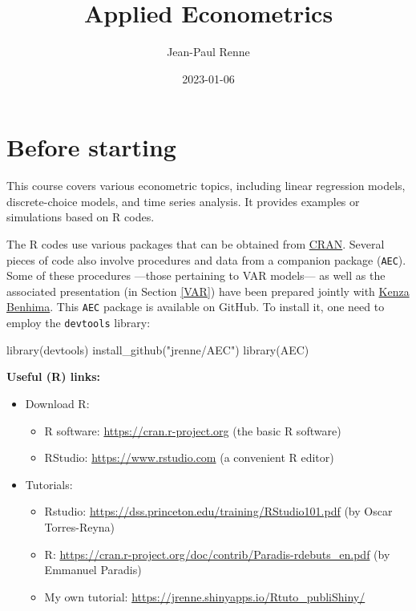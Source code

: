 \documentclass[
  12pt,
]{book}
\title{Applied Econometrics}
\author{Jean-Paul Renne}
\date{2023-01-06}
\newenvironment{Shaded}{\begin{snugshade}}{\end{snugshade}}
\newcommand{\FunctionTok}[1]{\textcolor[rgb]{0.00,0.00,0.00}{#1}}
\newcommand{\NormalTok}[1]{#1}
\newcommand{\StringTok}[1]{\textcolor[rgb]{0.31,0.60,0.02}{#1}}
\providecommand{\tightlist}{%
  \setlength{\itemsep}{0pt}\setlength{\parskip}{0pt}}
\theoremstyle{definition}
\theoremstyle{definition}
\theoremstyle{definition}
\theoremstyle{definition}
\theoremstyle{remark}
\begin{document}
\maketitle

{
\setcounter{tocdepth}{1}
\tableofcontents
}
\newcommand{\bv}[1]{\mathbf{#1}}

\hypertarget{intro}{%
\chapter{Before starting}\label{intro}}

This course covers various econometric topics, including linear regression models, discrete-choice models, and time series analysis. It provides examples or simulations based on R codes.

The R codes use various packages that can be obtained from \href{https://cran.r-project.org}{CRAN}. Several pieces of code also involve procedures and data from a companion package (\texttt{AEC}). Some of these procedures ---those pertaining to VAR models--- as well as the associated presentation (in Section \ref{VAR}) have been prepared jointly with \href{https://sites.google.com/site/benhimakenza/}{Kenza Benhima}. This \texttt{AEC} package is available on GitHub. To install it, one need to employ the \texttt{devtools} library:

\begin{Shaded}
\begin{Highlighting}[]
\FunctionTok{library}\NormalTok{(devtools)}
\FunctionTok{install\_github}\NormalTok{(}\StringTok{"jrenne/AEC"}\NormalTok{)}
\FunctionTok{library}\NormalTok{(AEC)}
\end{Highlighting}
\end{Shaded}

\textbf{Useful (R) links:}

\begin{itemize}
\item
  Download R:

  \begin{itemize}
  \tightlist
  \item
    R software: \url{https://cran.r-project.org} (the basic R software)
  \item
    RStudio: \url{https://www.rstudio.com} (a convenient R editor)
  \end{itemize}
\item
  Tutorials:

  \begin{itemize}
  \tightlist
  \item
    Rstudio: \url{https://dss.princeton.edu/training/RStudio101.pdf} (by Oscar Torres-Reyna)
  \item
    R: \url{https://cran.r-project.org/doc/contrib/Paradis-rdebuts_en.pdf} (by Emmanuel Paradis)
  \item
    My own tutorial: \url{https://jrenne.shinyapps.io/Rtuto_publiShiny/}
  \end{itemize}
\end{itemize}
\end{document}
